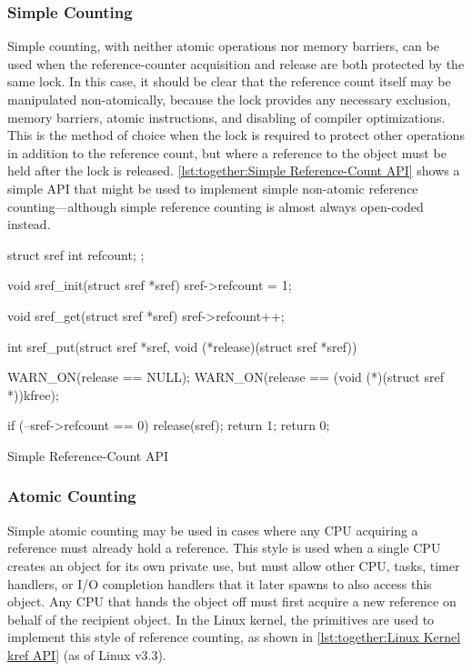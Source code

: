 \subsubsection{Simple Counting}
\label{sec:together:Simple Counting}

Simple counting, with neither atomic operations nor memory barriers,
can be used when the reference-counter acquisition and release are
both protected by the same lock.
In this case, it should be clear that the reference count itself
may be manipulated non-atomically, because the lock provides any
necessary exclusion, memory barriers, atomic instructions, and disabling
of compiler optimizations.
This is the method of choice when the lock is required to protect
other operations in addition to the reference count, but where
a reference to the object must be held after the lock is released.
\cref{lst:together:Simple Reference-Count API} shows a simple
API that might be used to implement simple non-atomic reference
counting---although simple reference counting is almost always
open-coded instead.

\begin{listing}[tbp]
\begin{fcvlabel}
\begin{VerbatimL}[commandchars=\\\[\]]
struct sref {
	int refcount;
};

void sref_init(struct sref *sref)
{
	sref->refcount = 1;
}

void sref_get(struct sref *sref)
{
	sref->refcount++;
}

int sref_put(struct sref *sref,
             void (*release)(struct sref *sref))
{
	WARN_ON(release == NULL);
	WARN_ON(release == (void (*)(struct sref *))kfree);

	if (--sref->refcount == 0) {
		release(sref);
		return 1;
	}
	return 0;
}
\end{VerbatimL}
\end{fcvlabel}
\caption{Simple Reference-Count API}
\label{lst:together:Simple Reference-Count API}
\end{listing}

\subsubsection{Atomic Counting}
\label{sec:together:Atomic Counting}

Simple atomic counting may be used in cases where any CPU acquiring
a reference must already hold a reference.
This style is used when a single CPU creates an object for its
own private use, but must allow other CPU, tasks, timer handlers,
or I/O completion handlers that it later spawns to also access this object.
Any CPU that hands the object off must first acquire a new reference
on behalf of the recipient object.
In the Linux kernel, the  primitives are used to implement
this style of reference counting, as shown in
\cref{lst:together:Linux Kernel kref API} (as of Linux v3.3).

